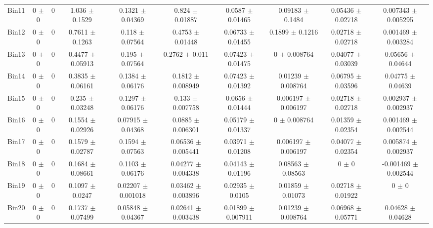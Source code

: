 \begin{tabular}{@{\extracolsep{4pt}}lccccccccc@{}}
     Bin11 & 0 $\pm$ 0 & 0 & 1.036 $\pm$ 0.1529 & 0.1321 $\pm$ 0.04369 & 0.824 $\pm$ 0.01887 & 0.0587 $\pm$ 0.01465 & 0.09183 $\pm$ 0.1484 & 0.05436 $\pm$ 0.02718 & 0.007343 $\pm$ 0.005295 \\ 
     Bin12 & 0 $\pm$ 0 & 0 & 0.7611 $\pm$ 0.1263 & 0.118 $\pm$ 0.07564 & 0.4753 $\pm$ 0.01448 & 0.06733 $\pm$ 0.01455 & 0.1899 $\pm$ 0.1216 & 0.02718 $\pm$ 0.02718 & 0.001469 $\pm$ 0.003284 \\ 
     Bin13 & 0 $\pm$ 0 & 0 & 0.4477 $\pm$ 0.05913 & 0.195 $\pm$ 0.07564 & 0.2762 $\pm$ 0.011 & 0.07423 $\pm$ 0.01475 & 0 $\pm$ 0.008764 & 0.04077 $\pm$ 0.03039 & 0.05656 $\pm$ 0.04644 \\ 
     Bin14 & 0 $\pm$ 0 & 0 & 0.3835 $\pm$ 0.06161 & 0.1384 $\pm$ 0.06176 & 0.1812 $\pm$ 0.008949 & 0.07423 $\pm$ 0.01392 & 0.01239 $\pm$ 0.008764 & 0.06795 $\pm$ 0.03596 & 0.04775 $\pm$ 0.04639 \\ 
     Bin15 & 0 $\pm$ 0 & 0 & 0.235 $\pm$ 0.03248 & 0.1297 $\pm$ 0.06176 & 0.133 $\pm$ 0.007758 & 0.0656 $\pm$ 0.01444 & 0.006197 $\pm$ 0.006197 & 0.02718 $\pm$ 0.02718 & 0.002937 $\pm$ 0.002937 \\ 
     Bin16 & 0 $\pm$ 0 & 0 & 0.1554 $\pm$ 0.02926 & 0.07915 $\pm$ 0.04368 & 0.0885 $\pm$ 0.006301 & 0.05179 $\pm$ 0.01337 & 0 $\pm$ 0.008764 & 0.01359 $\pm$ 0.02354 & 0.001469 $\pm$ 0.002544 \\ 
     Bin17 & 0 $\pm$ 0 & 0 & 0.1579 $\pm$ 0.02787 & 0.1594 $\pm$ 0.07563 & 0.06536 $\pm$ 0.005441 & 0.03971 $\pm$ 0.01208 & 0.006197 $\pm$ 0.006197 & 0.04077 $\pm$ 0.02354 & 0.005874 $\pm$ 0.002937 \\ 
     Bin18 & 0 $\pm$ 0 & 0 & 0.1684 $\pm$ 0.08661 & 0.1103 $\pm$ 0.06176 & 0.04277 $\pm$ 0.004338 & 0.04143 $\pm$ 0.01196 & 0.08563 $\pm$ 0.08563 & 0 $\pm$ 0 & -0.001469 $\pm$ 0.002544 \\ 
     Bin19 & 0 $\pm$ 0 & 0 & 0.1097 $\pm$ 0.0247 & 0.02207 $\pm$ 0.001018 & 0.03462 $\pm$ 0.003896 & 0.02935 $\pm$ 0.0105 & 0.01859 $\pm$ 0.01073 & 0.02718 $\pm$ 0.01922 & 0 $\pm$ 0 \\ 
     Bin20 & 0 $\pm$ 0 & 0 & 0.1737 $\pm$ 0.07499 & 0.05848 $\pm$ 0.04367 & 0.02641 $\pm$ 0.003438 & 0.01899 $\pm$ 0.007911 & 0.01239 $\pm$ 0.008764 & 0.06968 $\pm$ 0.05771 & 0.04628 $\pm$ 0.04628 \\ 
\hline\hline
  \end{tabular}
